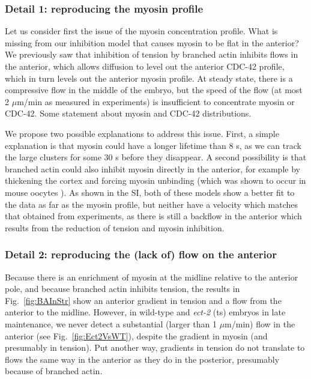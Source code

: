 \documentclass[11pt]{article}
\newcommand{\red}[1]{\color{red}#1\normalcolor}
\newcommand{\6}[1]{#1_{\text{6}}}
\newcommand{\3}[1]{#1_{\text{3}}}
\begin{document}
\subsubsection{Detail 1: reproducing the myosin profile}
Let us consider first the issue of the myosin concentration profile. What is missing from our inhibition model that causes myosin to be flat in the anterior? We previously saw that inhibition of tension by branched actin inhibits flows in the anterior, which allows diffusion to level out the anterior CDC-42 profile, which in turn levels out the anterior myosin profile. At steady state, there is a compressive flow in the middle of the embryo, but the speed of the flow (at most 2 $\mu$m/min as measured in experiments) is insufficient to concentrate myosin or CDC-42. \red{Some statement about myosin and CDC-42 distributions.}

We propose two possible explanations to address this issue. First, a simple explanation is that myosin could have a longer lifetime than 8 s, as we can track the large clusters for some 30 s before they disappear. A second possibility is that branched actin could also inhibit myosin directly in the anterior, for example by thickening the cortex and forcing myosin unbinding (which was shown to occur in mouse oocytes \cite{chaigne2015narrow}). As shown in the SI, both of these models show a better fit to the data as far as the myosin profile, but neither have a velocity which matches that obtained from experiments, as there is still a backflow in the anterior which results from the reduction of tension and myosin inhibition. 

\subsubsection{Detail 2: reproducing the (lack of) flow on the anterior}
Because there is an enrichment of myosin at the midline relative to the anterior pole, and because branched actin inhibits tension, the results in Fig.\ \ref{fig:BAInStr} show an anterior gradient in tension and a flow from the anterior to the midline. However, in wild-type and \emph{ect-2} (ts) embryos in late maintenance, we never detect a substantial (larger than 1 $\mu$m/min) flow in the anterior (see Fig.\ \ref{fig:Ect2VsWT}), despite the gradient in myosin (and presumably in tension). Put another way, gradients in tension do not translate to flows the same way in the anterior as they do in the posterior, presumably because of branched actin.
\end{document}
